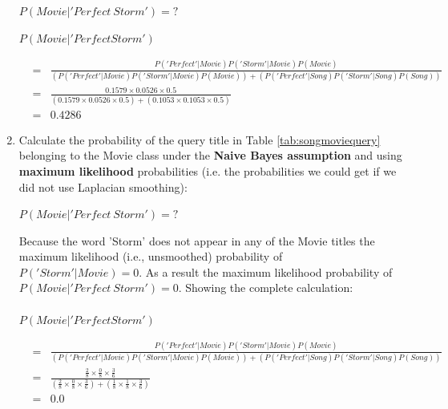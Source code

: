 \documentclass[--SOLUTION-OPTION--]{ditpaper}
\begin{document}
\begin{enumerate}
			\begin{center}
				$P(Movie|'Perfect~Storm')=?$
			\end{center}
			\begin{answer}
				$P(Movie|'Perfect Storm')$ 
				\begin{scriptsize}
				\begin{eqnarray*}
					&=& \frac{P('Perfect'|Movie)P('Storm'|Movie)P(Movie)}{(P('Perfect'|Movie)P('Storm'|Movie)P(Movie))+(P('Perfect'|Song)P('Storm'|Song)P(Song))}\\
					&=& \frac{0.1579 \times 0.0526 \times 0.5}{(0.1579 \times 0.0526 \times 0.5) + (0.1053 \times 0.1053 \times 0.5)}\\
					&=& 0.4286
				\end{eqnarray*}
				\end{scriptsize}
			\end{answer}
		\item Calculate the probability of the query title in Table \ref{tab:songmoviequery} belonging to the Movie class under the \textbf{Naive Bayes assumption} and using \textbf{maximum likelihood} probabilities (i.e. the probabilities we could get if we did not use Laplacian smoothing):	
					\begin{center}
				$P(Movie|'Perfect~Storm')=?$
			\end{center}
			\marks{4}
			\begin{answer}
				Because the word 'Storm' does not appear in any of the Movie titles the maximum likelihood (i.e., unsmoothed) probability of $P('Storm'|Movie)=0$. As a result the maximum likelihood probability of $P(Movie|'Perfect~Storm')=0$. Showing the complete calculation: \\
				\\
				$P(Movie|'Perfect Storm')$
				\begin{scriptsize}
				\begin{eqnarray*}
					 &=& \frac{P('Perfect'|Movie)P('Storm'|Movie)P(Movie)}{(P('Perfect'|Movie)P('Storm'|Movie)P(Movie))+(P('Perfect'|Song)P('Storm'|Song)P(Song))}\\
					&=& \frac{\frac{2}{8} \times \frac{0}{8} \times \frac{3}{6}}{(\frac{2}{8} \times \frac{0}{8} \times \frac{3}{6}) + (\frac{1}{8} \times \frac{1}{8} \times \frac{3}{6})}\\
					&=& 0.0
				\end{eqnarray*}
				\end{scriptsize}
			\end{answer}
	\end{enumerate}
%
\newpage
\end{document}
